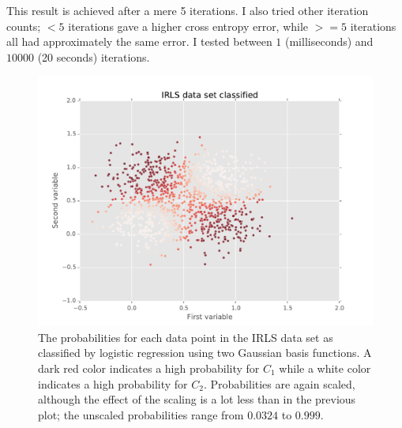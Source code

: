 \documentclass[paper=a4, fontsize=10pt]{scrartcl} %
\numberwithin{equation}{section} %
\numberwithin{figure}{section} %
\numberwithin{table}{section} %
\begin{document}
\begin{enumerate}
 		This result is achieved after a mere 5 iterations. I also tried other iteration counts; $< 5$ iterations gave a higher cross entropy error, while $>= 5$ iterations all had approximately the same error. I tested between $1$ (milliseconds) and $10000$ (20 seconds) iterations.

		\begin{figure}[H]
			\centering
			\includegraphics[scale=0.75]{exercise_225.pdf}
			\caption{The probabilities for each data point in the IRLS data set as classified by logistic regression using two Gaussian basis functions. A dark red color indicates a high probability for $C_1$ while a white color indicates a high probability for $C_2$. Probabilities are again scaled, although the effect of the scaling is a lot less than in the previous plot; the unscaled probabilities range from $0.0324$ to $0.999$.}
			\label{scatter_gaussian_p}
		\end{figure}
\end{enumerate}
\end{document}
